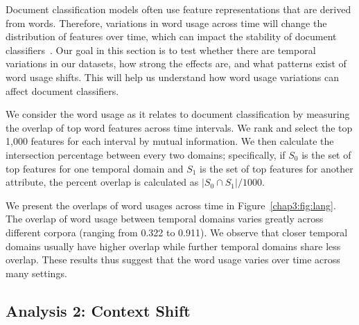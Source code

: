 Document classification models often use feature representations that are derived from words. Therefore, variations in word usage across time will change the distribution of features over time, which can impact the stability of document classifiers~\cite{huang2018examining}. 
Our goal in this section is to test whether there are temporal variations in our datasets, how strong the effects are, and what patterns exist of word usage shifts. This will help us understand how word usage variations can affect document classifiers.

We consider the word usage as it relates to document classification by measuring the overlap of top word features across time intervals. We rank and select the top 1,000 features for each interval by mutual information. We then calculate the intersection percentage between every two domains; 
specifically, if $S_0$ is the set of top features for one temporal domain and $S_1$ is the set of top features for another attribute, the percent overlap is calculated as $|S_0 \cap S_1|/1000$.

We present the overlaps of word usages across time in Figure~\ref{chap3:fig:lang}.
The overlap of word usage between temporal domains varies greatly across different corpora (ranging from 0.322 to 0.911). We observe that closer temporal domains usually have higher overlap while further temporal domains share less overlap. These results thus suggest that the word usage varies over time across many settings.


\subsection{Analysis 2: Context Shift}
\label{chap3:subsec:ctt_shift}

